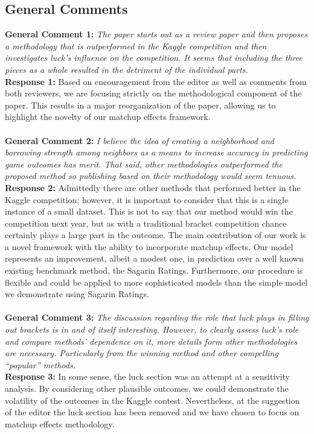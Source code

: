 \documentclass[11pt]{article} %
\begin{document}
\subsection*{General Comments}
{\bf General Comment 1:} \emph{The paper starts out as a review paper and then proposes a methodology that is outperformed in the Kaggle competition and then investigates luck's influence on the competition. It seems that including the three pieces as a whole resulted in the detriment of the individual parts.}\\
{\bf Response 1:} Based on encouragement from the editor as well as comments from both reviewers, we are focusing strictly on the methodological component of the paper. This results in a major reorganization of the paper, allowing us to highlight the novelty of our matchup effects framework.\\
\\
{\bf General Comment 2:} \emph{I believe the idea of creating a neighborhood and borrowing strength among neighbors as a means to increase accuracy in predicting game outcomes has merit. That said, other methodologies outperformed the proposed method so publishing based on their methodology would seem tenuous.}\\
{\bf Response 2:} Admittedly there are other methods that performed better in the Kaggle competition; however, it is important to consider that this is a single instance of a small dataset. This is not to say that our method would win the competition next year, but as with a traditional bracket competition chance certainly plays a large part in the outcome. The main contribution of our work is a novel framework with the ability to incorporate matchup effects. Our model represents an improvement, albeit a modest one, in prediction over a well known existing benchmark method, the Sagarin Ratings. Furthermore, our procedure is flexible and could be applied to more sophisticated models than the simple model we demonstrate using Sagarin Ratings.  \\
\\
{\bf General Comment 3:} \emph{The discussion regarding the role that luck plays in filling out brackets is in and of itself interesting. However, to clearly assess luck's role and compare methods' dependence on it, more details form other methodologies are necessary. Particularly from the winning method and other compelling ``popular'' methods.}\\
{\bf Response 3:} In some sense, the luck section was an attempt at a sensitivity analysis. By considering other plausible outcomes, we could demonstrate the volatility of the outcomes in the Kaggle contest. Nevertheless, at the suggestion of the editor the luck section has been removed and we have chosen to focus on matchup effects methodology.\\
\end{document}
